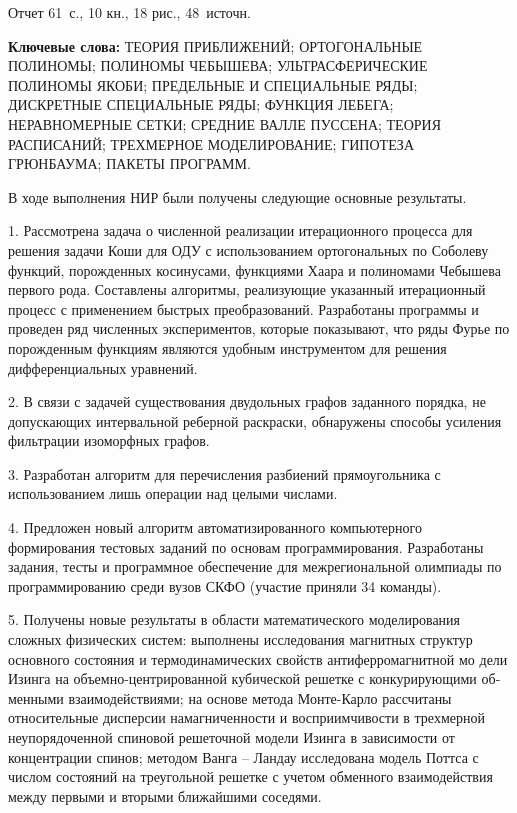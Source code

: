 \Referat %

Отчет 61~с., 10 кн., 18 рис., 48~источн.

 \bigskip
 \textbf{ Ключевые
  слова:}
  ТЕОРИЯ ПРИБЛИЖЕНИЙ; ОРТОГОНАЛЬНЫЕ ПОЛИНОМЫ; ПОЛИНОМЫ ЧЕБЫШЕВА; УЛЬТРАСФЕРИЧЕСКИЕ ПОЛИНОМЫ ЯКОБИ; ПРЕДЕЛЬНЫЕ И СПЕЦИАЛЬНЫЕ РЯДЫ; ДИСКРЕТНЫЕ СПЕЦИАЛЬНЫЕ РЯДЫ; ФУНКЦИЯ ЛЕБЕГА; НЕРАВНОМЕРНЫЕ СЕТКИ; СРЕДНИЕ ВАЛЛЕ ПУССЕНА; ТЕОРИЯ РАСПИСАНИЙ; ТРЕХМЕРНОЕ МОДЕЛИРОВАНИЕ; ГИПОТЕЗА ГРЮНБАУМА; ПАКЕТЫ ПРОГРАММ.

 \bigskip

В ходе выполнения НИР были получены следующие основные результаты.

1. Рассмотрена задача о численной реализации итерационного процесса для решения задачи Коши для ОДУ с использованием ортогональных по Соболеву функций, порожденных косинусами, функциями Хаара и полиномами Чебышева первого рода. Составлены алгоритмы, реализующие указанный итерационный процесс с применением быстрых преобразований. Разработаны программы и проведен ряд численных экспериментов, которые показывают, что ряды Фурье по порожденным функциям являются удобным инструментом для решения дифференциальных уравнений.

2. В связи с задачей существования двудольных графов заданного порядка, не допускающих интервальной реберной раскраски,
обнаружены способы усиления фильтрации изоморфных графов.

3. Разработан алгоритм для перечисления разбиений прямоугольника с использованием лишь операции над целыми числами.

4. Предложен новый алгоритм автоматизированного компьютерного формирования тестовых заданий по основам программирования.
Разработаны задания, тесты и программное обеспечение для межрегиональной олимпиады по программированию среди вузов СКФО (участие приняли 34 команды).

5.  Получены новые результаты в области математического моделирования сложных физических систем:
выполнены исследования магнитных структур основного состояния и термодинамических свойств антиферромагнитной мо
дели Изинга на объемно-центрированной кубической решетке с конкурирующими об­
менными взаимодействиями;
%
на основе метода Монте-Карло рассчитаны относительные дисперсии намагниченности и восприимчивости в трехмерной неупорядоченной спиновой решеточной модели Изинга в зависимости от концентрации спинов;
%
методом Ванга – Ландау исследована модель Поттса с числом состояний на треугольной решетке с учетом обменного взаимодействия между первыми и вторыми ближайшими соседями.



